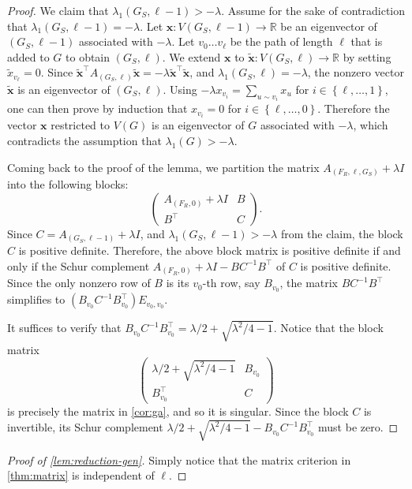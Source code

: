 \documentclass[11pt]{article}
\theoremstyle{definition}
\theoremstyle{remark}
\newcommand{\sset}[1]{\left\{{#1}\right\}}
\newcommand{\la}{\lambda}
\newcommand{\R}{\mathbb{R}}
\newcommand{\bx}{\bm{x}}
\newcommand{\tbx}{\tilde{\bm{x}}}
\newcommand{\T}{\intercal}
\begin{document}
\begin{proof}
    We claim that $\la_1(G_S, \ell-1) > -\la$. Assume for the sake of contradiction that $\la_1(G_S, \ell-1) = -\la$. Let $\bx \colon V(G_S,\ell-1) \to \R$ be an eigenvector of $(G_S, \ell-1)$ associated with $-\la$. Let $v_0 \dots v_\ell$ be the path of length $\ell$ that is added to $G$ to obtain $(G_S, \ell)$. We extend $\bx$ to $\tbx \colon V(G_S, \ell) \to \R$ by setting $\tilde{x}_{v_\ell} = 0$. Since $\tbx^\T A_{(G_S,\ell)}\tbx = -\la \tbx^\T\tbx$, and $\la_1(G_S,\ell) = -\la$, the nonzero vector $\tbx$ is an eigenvector of $(G_S,\ell)$. Using $-\la x_{v_i} = \sum_{u \sim v_i} x_u$ for $i \in \sset{\ell, \dots, 1}$, one can then prove by induction that $x_{v_i} = 0$ for $i \in \sset{\ell, \dots, 0}$. Therefore the vector $\bx$ restricted to $V(G)$ is an eigenvector of $G$ associated with $-\la$, which contradicts the assumption that $\la_1(G) > -\la$.

    Coming back to the proof of the lemma, we partition the matrix $A_{(F_R, \ell, G_S)} + \la I$ into the following blocks:
    \[
        \begin{pmatrix}
            A_{(F_R,0)}+\la I & B \\
            B^\T & C
        \end{pmatrix}.
    \]
    Since $C = A_{(G_S, \ell-1)}+\la I$, and $\la_1(G_S, \ell-1) > -\la$ from the claim, the block $C$ is positive definite. Therefore, the above block matrix is positive definite if and only if the Schur complement $A_{(F_R,0)} + \la I - BC^{-1}B^\T$ of $C$ is positive definite. Since the only nonzero row of $B$ is its $v_0$-th row, say $B_{v_0}$, the matrix $BC^{-1}B^\T$ simplifies to $\left(B_{v_0}C^{-1}B_{v_0}^\T\right) E_{v_0,v_0}$.
    
    It suffices to verify that $B_{v_0} C^{-1}B_{v_0}^\T = \la/2 + \sqrt{\la^2 / 4 - 1}$. Notice that the block matrix
    \[
        \begin{pmatrix}
            \la/2 + \sqrt{\la^2 / 4 - 1} & B_{v_0} \\
            B_{v_0}^\T & C    
        \end{pmatrix}
    \] is precisely the matrix in \cref{cor:ga}, and so it is singular. Since the block $C$ is invertible, its Schur complement $\la/2 + \sqrt{\la^2 / 4 - 1} - B_{v_0}C^{-1}B_{v_0}^\T$ must be zero.
\end{proof}

\begin{proof}[Proof of \cref{lem:reduction-gen}]
    Simply notice that the matrix criterion in \cref{thm:matrix} is independent of $\ell$.
\end{proof}
\end{document}
